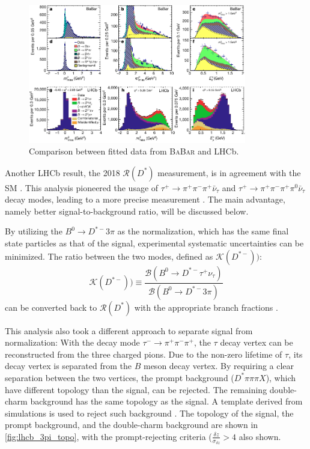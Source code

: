 \documentclass[12pt,letterpaper]{article}
\def\BaBar/{\textsc{BaBar}}
\def\RDst/{\ensuremath{\mathcal{R}(D^{*})}}
\begin{document}
\begin{figure}[ht]
    \centering
    \includegraphics[width=0.85\textwidth]{figs/babar_lhcb_fit_comparison.pdf}
    \caption{
        Comparison between fitted data from \BaBar/ and LHCb.
    }
    \label{fig:babar_lhcb_fit_comparison}
\end{figure}

Another LHCb result, the 2018 \RDst/ measurement, is in agreement with the SM \cite{Aaij:2017deq}.
This analysis pioneered the usage of 
$\tau^+ \rightarrow \pi^+ \pi^- \pi^+ \bar{\nu}_\tau$ 
and
$\tau^+ \rightarrow \pi^+ \pi^- \pi^+ \pi^0 \bar{\nu}_\tau$
decay modes, leading to a more precise measurement \cite{Aaij:2017deq}.
The main advantage, namely better signal-to-background ratio, will be discussed below.

By utilizing the $B^0 \rightarrow D^{*-} 3\pi$ as the normalization, which has the same final state particles as that of the signal, experimental systematic uncertainties can be minimized.
The ratio between the two modes, defined as $\mathcal{K}(D^{*-}))$:
\begin{equation}
    \mathcal{K}(D^{*-})) \equiv \frac{
        \mathcal{B}(B^0 \rightarrow D^{*-} \tau^+ \nu_\tau)
    }{
        \mathcal{B}(B^0 \rightarrow D^{*-} 3 \pi)
    }
\end{equation}
can be converted back to \RDst/ with the appropriate branch fractions \cite{Aaij:2017deq}.

This analysis also took a different approach to separate signal from normalization:
With the decay mode $\tau^- \rightarrow \pi^+ \pi^- \pi^+$,
the $\tau$ decay vertex can be reconstructed from the three charged pions.
Due to the non-zero lifetime of $\tau$, its decay vertex is
separated from the $B$ meson decay vertex.
By requiring a clear separation between the two vertices, the prompt background
($D^* \pi \pi \pi X$), which have different topology than the signal, can be rejected.
The remaining double-charm background has the same topology as the signal.
A template derived from simulations is used to reject such
background \cite{Aaij:2017deq}.
The topology of the signal, the prompt background, and the double-charm background are shown in \autoref{fig:lhcb_3pi_topo}, with the prompt-rejecting criteria ($\frac{\delta z}{\sigma_{\delta z}} > 4$ also shown.
\end{document}

